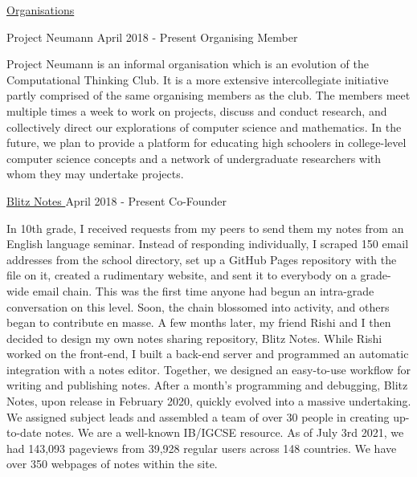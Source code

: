 \documentclass{resume} %
\begin{document}
\begin{rSection}{\href{ https://www.nitvishn.net/\#/organisations }{Organisations}}

\begin{rSubsection}{ 
     Project Neumann 
    }{ 
     April 2018 - Present 
     }{  Organising Member  }
\item Project Neumann is an informal organisation which is an evolution of the Computational Thinking Club. It is a more extensive intercollegiate initiative partly comprised of the same organising members as the club. The members meet multiple times a week to work on projects, discuss and conduct research, and collectively direct our explorations of computer science and mathematics. In the future, we plan to provide a platform for educating high schoolers in college-level computer science concepts and a network of undergraduate researchers with whom they may undertake projects.
\end{rSubsection}


\begin{rSubsection}{ 
     \href{ https://www.blitznotes.org/ }{ Blitz Notes } 
    }{ 
     April 2018 - Present 
     }{  Co-Founder  }
\item In 10th grade, I received requests from my peers  to send them my notes from an English language seminar. Instead of responding individually, I scraped 150 email addresses from the school directory, set up a GitHub Pages repository with the file on it, created a rudimentary website, and sent it to everybody on a grade-wide email chain.      This was the first time anyone had begun an intra-grade conversation on this level. Soon, the chain blossomed into activity, and others began to contribute en masse.      A few months later, my friend Rishi and I then decided to design my own notes sharing repository, Blitz Notes.      While Rishi worked on the front-end, I built a back-end server and programmed an automatic integration with a notes editor. Together, we designed an easy-to-use workflow for writing and publishing notes. After a month’s programming and debugging, Blitz Notes, upon release in February 2020, quickly evolved into a massive undertaking. We assigned subject leads and assembled a team of over 30 people in creating up-to-date notes. We are a well-known IB/IGCSE resource. As of July 3rd 2021, we had 143,093 pageviews from 39,928 regular users across 148 countries. We have over 350 webpages of notes within the site.      
\end{rSubsection}



\end{rSection}
\end{document}
